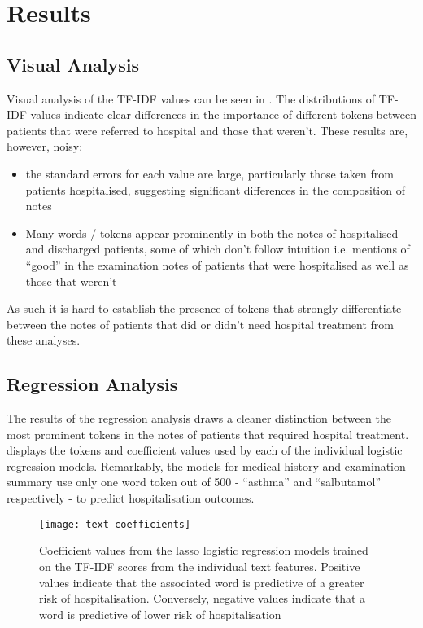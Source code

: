    \section{Results}\label{sec:results}

   \subsection{Visual Analysis}

   Visual analysis of the TF-IDF values can be seen in . The distributions of TF-IDF values indicate clear differences in the importance of different tokens between patients that were referred to hospital and those that weren't. These results are, however, noisy:

   \begin{itemize}
       \item the standard errors for each value are large, particularly those taken from patients hospitalised, suggesting significant differences in the composition of notes
       \item Many words / tokens appear prominently in both the notes of hospitalised and discharged patients, some of which don't follow intuition i.e. mentions of ``good'' in the examination notes of patients that were hospitalised as well as those that weren't
   \end{itemize}

   As such it is hard to establish the presence of tokens that strongly differentiate between the notes of patients that did or didn't need hospital treatment from these analyses.

   \subsection{Regression Analysis}\label{subsec:regression-analysis}

   The results of the regression analysis draws a cleaner distinction between the most prominent tokens in the notes of patients that required hospital treatment.  displays the tokens and coefficient values used by each of the individual logistic regression models. Remarkably, the models for medical history and examination summary use only one word token out of 500 - ``asthma'' and ``salbutamol'' respectively - to predict hospitalisation outcomes.

   \begin{figure}[H]
       \centering
       \texttt{[image: text-coefficients]}
       \caption[Coefficients for TF-IDF score logistic regression models]{Coefficient values from the lasso logistic regression models trained on the TF-IDF scores from the individual text features. Positive values indicate that the associated word is predictive of a greater risk of hospitalisation. Conversely, negative values indicate that a word is predictive of lower risk of hospitalisation}
       \label{fig:text-coefficients}
   \end{figure}

